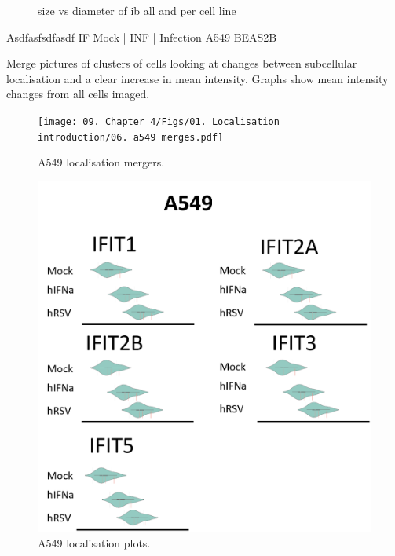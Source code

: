 \begin{figure}
    \caption[size vs diameter of ib all and per cell line]{size vs diameter of ib all and per cell line}
    \label{fig:size vs diameter of ib all and per cell line}
    
\end{figure}


Asdfasfsdfasdf \newline
IF Mock | INF | Infection \newline
A549 BEAS2B

Merge pictures of clusters of cells looking at changes between subcellular localisation and a clear increase in mean intensity. Graphs show mean intensity changes from all cells imaged.

\begin{figure}
    \centering
    \texttt{[image: 09. Chapter 4/Figs/01. Localisation introduction/06. a549 merges.pdf]}
    \caption[A549 localisation mergers.]{A549 localisation mergers.}
    \label{fig:A549 localisation mergers.}
\end{figure}


\begin{figure}
    \centering
    \includegraphics[width=1\linewidth]{09. Chapter 4/Figs/01. Localisation introduction/07. a549 plots.png}
    \caption[A549 localisation plots.]{A549 localisation plots.}
    \label{fig:A549 localisation plots.}
\end{figure}


